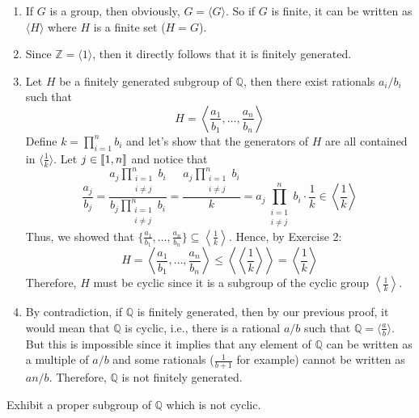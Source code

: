 \begin{solution}
    \begin{enumerate}[label = \textbf{(\alph*)}]
        \item If $G$ is a group, then obviously, $G = \langle G \rangle$. So if $G$ is finite, it can be written as $\langle H \rangle$ where $H$ is a finite set ($H = G$).
        \item Since $\mathbb{Z} = \langle 1 \rangle$, then it directly follows that it is finitely generated.
        \item Let $H$ be a finitely generated subgroup of $\mathbb{Q}$, then there exist rationals $a_i/b_i$ such that
        $$H = \left< \frac{a_1}{b_1}, \dots , \frac{a_n}{b_n} \right>$$
        Define $k = \prod_{i=1}^{n}b_i$ and let's show that the generators of $H$ are all contained in $\langle \frac{1}{k} \rangle$. Let $j \in \llbracket 1 , n \rrbracket$ and notice that
        $$\frac{a_j}{b_j} = \frac{a_j \prod_{\substack{i=1 \\ i \neq j}}^{n}b_i}{b_j\prod_{\substack{i=1 \\ i \neq j}}^{n}b_i} = \frac{a_j \prod_{\substack{i=1 \\ i \neq j}}^{n}b_i}{k} = a_j \prod_{\substack{i=1 \\ i \neq j}}^{n}b_i \cdot \frac{1}{k} \in \left< \frac{1}{k} \right>$$
        Thus, we showed that $\{ \frac{a_1}{b_1}, \dots , \frac{a_n}{b_n} \} \subseteq \left< \frac{1}{k} \right>$. Hence, by Exercise 2:
        $$H = \left< \frac{a_1}{b_1}, \dots , \frac{a_n}{b_n} \right> \leq \left<\left< \frac{1}{k} \right>\right> = \left< \frac{1}{k} \right>$$
        Therefore, $H$ must be cyclic since it is a subgroup of the cyclic group $\left< \frac{1}{k} \right>$.

        \item By contradiction, if $\mathbb{Q}$ is finitely generated, then by our previous proof, it would mean that $\mathbb{Q}$ is cyclic, i.e., there is a rational $a/b$ such that $\mathbb{Q} = \langle \frac{a}{b} \rangle$. But this is impossible since it implies that any element of $\mathbb{Q}$ can be written as a multiple of $a/b$ and some rationals ($\frac{1}{b+1}$ for example) cannot be written as $an/b$. Therefore, $\mathbb{Q}$ is not finitely generated.\\
    \end{enumerate}
\end{solution}

\begin{exercise}
    Exhibit a proper subgroup of $\mathbb{Q}$ which is not cyclic. \\
\end{exercise}

